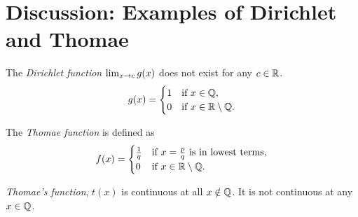 \section{Discussion: Examples of Dirichlet and Thomae}

\begin{definition}
    The \textit{Dirichlet function} \(\lim_{x \rightarrow c}g(x)\) does not exist for any \(c \in \mathbb{R}\).
    \[
        g(x) = \begin{cases}
            1 & \text{if } x \in \mathbb{Q},              \\
            0 & \text{if } x \in \mathbb{R} \setminus \mathbb{Q}.
        \end{cases}
    \]
\end{definition}
\begin{center}

\end{center}

\begin{definition}
    The \textit{Thomae function} is defined as
    \[
        f(x) = \begin{cases}
            \frac{1}{q} & \text{if } x = \frac{p}{q} \text{ is in lowest terms}, \\
            0           & \text{if } x \in \mathbb{R} \setminus \mathbb{Q}.
        \end{cases}
    \]
\end{definition}

\textit{Thomae's function}, \(t(x)\) is continuous at all \(x \notin \mathbb{Q}\). It is not continuous at any \(x \in \mathbb{Q}\).

\newpage

